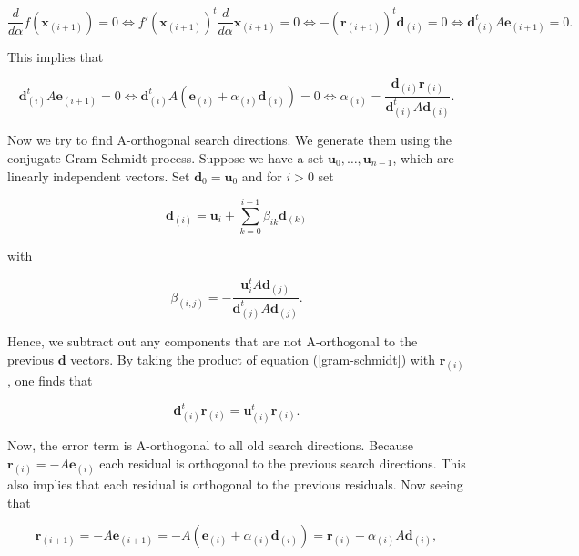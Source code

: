 \documentclass[12pt,a4paper,oneside]{book}
\begin{document}
{\begin{equation}
\dfrac{d}{d \alpha} f(\bm{x}_{(i+1)})  = 0 \Leftrightarrow f'(\bm{x}_{(i+1)})^t  \dfrac{d}{d \alpha} \bm{x}_{(i+1)}= 0 \Leftrightarrow - (\bm{r}_{(i+1)})^t \bm{d}_{(i)} = 0  \Leftrightarrow \bm{d}_{(i)}^t A \bm{e}_{(i+1)} = 0.
\end{equation}

This implies that 

\begin{equation} \label{search_direction}
\bm{d}_{(i)}^t A \bm{e}_{(i+1)} =0 \Leftrightarrow \bm{d}_{(i)}^t A (\bm{e}_{(i)} + \alpha_{(i)} \bm{d}_{(i)}) = 0 \Leftrightarrow \alpha_{(i)} = \dfrac{\bm{d}_{(i)} \bm{r}_{(i)} }{ \bm{d}_{(i)}^t A \bm{d}_{(i)}}. 
\end{equation}

Now we try to find A-orthogonal search directions. We generate them using the conjugate Gram-Schmidt process. Suppose we have a set $\bm{u}_0, \ldots, \bm{u}_{n-1}$, which are linearly independent vectors. Set $\bm{d}_{0} = \bm{u}_0$ and for $i>0$ set 

\begin{equation}\label{gram-schmidt}
\bm{d}_{(i)} = \bm{u}_i + \sum\limits_{k=0}^{i-1}\beta_{ik} \bm{d}_{(k)}
\end{equation}

with 

\begin{equation}
\beta_{(i,j)} = - \dfrac{\bm{u}_{i}^t A \bm{d}_{(j)}}{\bm{d}_{(j)}^t A \bm{d}_{(j)}}.
\end{equation}

Hence, we subtract out any components that are not A-orthogonal to the previous $\bm{d}$ vectors. By taking the product of equation (\ref{gram-schmidt}) with $\bm{r}_{(i)}$, one finds that 

\begin{equation} \label{conjugate_grad_3}
\bm{d}_{(i)}^t \bm{r}_{(i)} = \bm{u}_{(i)}^t \bm{r}_{(i)}.
\end{equation}


Now, the error term is A-orthogonal to all old search directions. Because  $\bm{r}_{(i)} = - A \bm{e}_{(i)}$ each residual is orthogonal to the previous search directions. This also implies that each residual is  orthogonal to the previous residuals. Now seeing that 

\begin{equation}\label{Conj_grad_1}
\bm{r}_{(i+1)} = -A \bm{e}_{(i+1)} = -A (\bm{e}_{(i)} + \alpha_{(i)} \bm{d}_{(i)}) = \bm{r}_{(i)}  - \alpha_{(i)} A \bm{d}_{(i)},
\end{equation}

}
\end{document}
